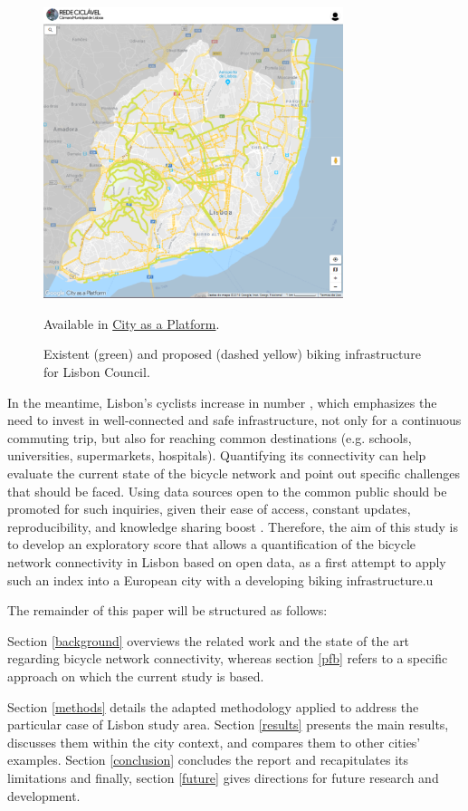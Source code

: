 \documentclass[information,article,submit,moreauthors,Latex,dvi2pdf,10pt,a4paper]{Definitions/mdpi}
\begin{document}
\begin{figure}[ht]
	\begin{center}
		\includegraphics[height=8.5cm]{fig1}
		\caption{Existent (green) and proposed (dashed yellow) biking infrastructure for Lisbon Council.} Available in \protect\href{https://lisboa.city-platform.com/app/?a=redeciclavel}{City as a Platform}.
		\label{fig1}
	\end{center}
\end{figure}

In the meantime, Lisbon's cyclists increase in number \cite{Baratto2016}, which emphasizes the need to invest in well-connected and safe infrastructure, not only for a continuous commuting trip, but also for reaching common destinations (e.g. schools, universities, supermarkets, hospitals). Quantifying its connectivity can help evaluate the current state of the bicycle network and point out specific challenges that should be faced. Using data sources open to the common public should be promoted for such inquiries, given their ease of access, constant updates, reproducibility, and knowledge sharing boost \cite{opendatahandbook,EuropeanDataPortal2018}. Therefore, the aim of this study is to develop an exploratory score that allows a quantification of the bicycle network connectivity in Lisbon based on open data, as a first attempt to apply such an index into a European city with a developing biking infrastructure.u

The remainder of this paper will be structured as follows: 
\begin{mycolorbox}[colback=yellow]
Section \ref{background} overviews the related work and the state of the art regarding bicycle network connectivity, whereas section \ref{pfb} refers to a specific approach on which the current study is based.
\end{mycolorbox}
Section \ref{methods} details the adapted methodology applied to address the particular case of Lisbon study area. Section \ref{results} presents the main results, discusses them within the city context, and compares them to other cities' examples. Section \ref{conclusion} concludes the report and recapitulates its limitations and finally, section \ref{future} gives directions for future research and development.
\end{document}
